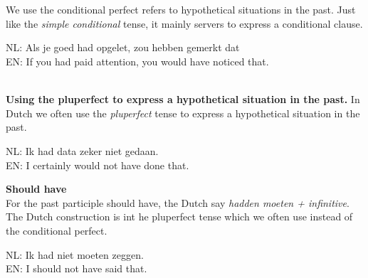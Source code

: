 \documentclass[letterpaper,11pt]{article}
\begin{document}
\\ \\
We use the conditional perfect refers to hypothetical situations in the
past. Just like the \textit{simple conditional} tense, it mainly servers to
express a conditional clause.
\\
\begin{small}
    \indent NL: Als je goed had opgelet, zou hebben gemerkt dat \\
    \indent EN: If you had paid attention, you would have noticed that. \\
\end{small}
\\
\textbf{Using the pluperfect to express a hypothetical situation in the past.}
In Dutch we often use the \textit{pluperfect} tense to express a hypothetical
situation in the past.
\begin{small}
    \indent NL: Ik had data zeker niet gedaan. \\
    \indent EN: I certainly would not have done that. \\
\end{small}
\textbf{Should have}
\\
For the past participle should have, the Dutch say \textit{hadden moeten +
infinitive}. The Dutch construction is int he pluperfect tense which we often
use instead of the conditional perfect.
\\
\begin{small}
     \indent NL: Ik had niet moeten zeggen.   \\
     \indent EN: I should not have said that. \\
\end{small}
\end{document}

